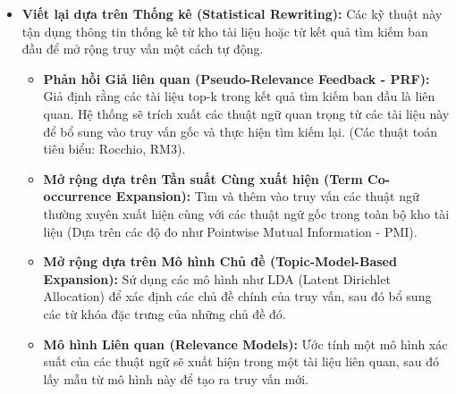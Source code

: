 \begin{itemize}
\begin{itemize}
\begin{itemize}
            \item \textbf{Viết lại dựa trên Thống kê (Statistical Rewriting):} 
            Các kỹ thuật này tận dụng thông tin thống kê từ kho tài liệu hoặc từ kết quả tìm kiếm ban đầu để mở rộng truy vấn một cách tự động.
            \begin{itemize}
                \item \textbf{Phản hồi Giả liên quan (Pseudo-Relevance Feedback - PRF):} Giả định rằng các tài liệu top-k trong kết quả tìm kiếm ban đầu là liên quan. Hệ thống sẽ trích xuất các thuật ngữ quan trọng từ các tài liệu này để bổ sung vào truy vấn gốc và thực hiện tìm kiếm lại. (Các thuật toán tiêu biểu: Rocchio, RM3).
                \item \textbf{Mở rộng dựa trên Tần suất Cùng xuất hiện (Term Co-occurrence Expansion):} Tìm và thêm vào truy vấn các thuật ngữ thường xuyên xuất hiện cùng với các thuật ngữ gốc trong toàn bộ kho tài liệu (Dựa trên các độ đo như Pointwise Mutual Information - PMI).
                \item \textbf{Mở rộng dựa trên Mô hình Chủ đề (Topic-Model-Based Expansion):} Sử dụng các mô hình như LDA (Latent Dirichlet Allocation) để xác định các chủ đề chính của truy vấn, sau đó bổ sung các từ khóa đặc trưng của những chủ đề đó.
                \item \textbf{Mô hình Liên quan (Relevance Models):} Ước tính một mô hình xác suất của các thuật ngữ sẽ xuất hiện trong một tài liệu liên quan, sau đó lấy mẫu từ mô hình này để tạo ra truy vấn mới.
            \end{itemize}
            

\end{itemize}
\end{itemize}
\end{itemize}
